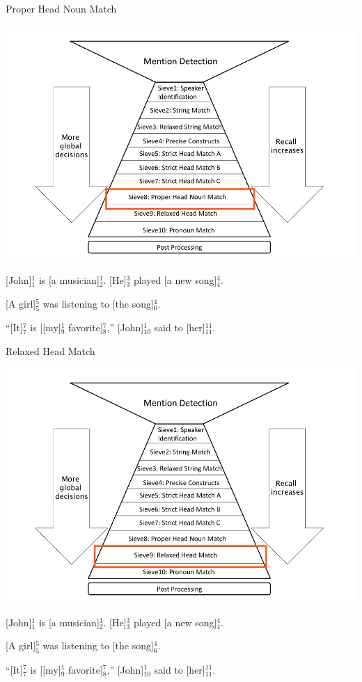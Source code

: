\documentclass[11pt,a4paper]{beamer}
\begin{document}
\begin{frame}{Proper Head Noun Match}

\includegraphics[scale=0.15]{sieve8.png} 
\bigskip

[John]$^{1}_{1}$ is [a musician]$^{1}_{2}$. [He]$^{3}_{3}$ played [a new song]$^{4}_{4}$.

[A girl]$^{5}_{5}$ was listening to [the song]$^{4}_{6}$.

“[It]$^{7}_{7}$ is [[my]$^{1}_{9}$ favorite]$^{7}_{8}$,” [John]$^{1}_{10}$ said to [her]$^{11}_{11}$.

\end{frame}

\begin{frame}{Relaxed Head Match}

\includegraphics[scale=0.15]{sieve9.png} 
\bigskip

[John]$^{1}_{1}$ is [a musician]$^{1}_{2}$. [He]$^{3}_{3}$ played [a new song]$^{4}_{4}$.

[A girl]$^{5}_{5}$ was listening to [the song]$^{4}_{6}$.

“[It]$^{7}_{7}$ is [[my]$^{1}_{9}$ favorite]$^{7}_{8}$,” [John]$^{1}_{10}$ said to [her]$^{11}_{11}$.

\end{frame}
\end{document}
